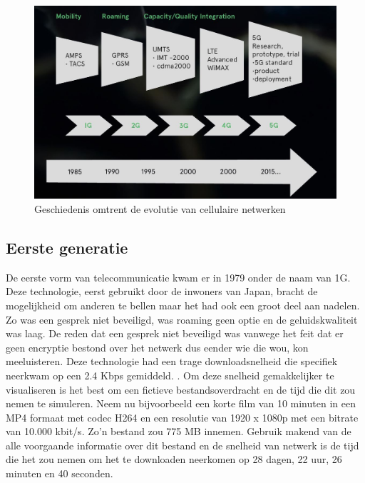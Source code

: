 \begin{figure}[!htb]
    \includegraphics[width=1\linewidth]{graphics/cellular_history_timeline}
    \caption[Overzicht omtrent de geschiedenis van cellulaire netwerken]{Geschiedenis omtrent de evolutie van cellulaire netwerken \autocite{Keenan2020}}
    \label{fig:cellularhistory}
\end{figure}

\subsection{Eerste generatie}

De eerste vorm van telecommunicatie kwam er in 1979 onder de naam van 1G. Deze technologie, eerst gebruikt door de inwoners van Japan, bracht de mogelijkheid om anderen te bellen maar het had ook een groot deel aan nadelen. Zo was een gesprek niet beveiligd, was roaming geen optie en de geluidskwaliteit was laag.
De reden dat een gesprek niet beveiligd was vanwege het feit dat er geen encryptie bestond over het netwerk dus eender wie die wou, kon meeluisteren. Deze technologie had een trage downloadsnelheid die specifiek neerkwam op een 2.4 Kbps gemiddeld. \autocite{Galazzo2020}. Om deze snelheid gemakkelijker te visualiseren is het best om een fictieve bestandsoverdracht en de tijd die dit zou nemen te simuleren. Neem nu bijvoorbeeld een korte film van 10 minuten in een MP4 formaat met codec H264 en een resolutie van 1920 x 1080p met een bitrate van 10.000 kbit/s. Zo'n bestand zou 775 MB innemen. \autocite{Helme2019} Gebruik makend van de alle voorgaande informatie over dit bestand en de snelheid van netwerk is de tijd die het zou nemen om het te downloaden neerkomen op 28 dagen, 22 uur, 26 minuten en 40 seconden.

